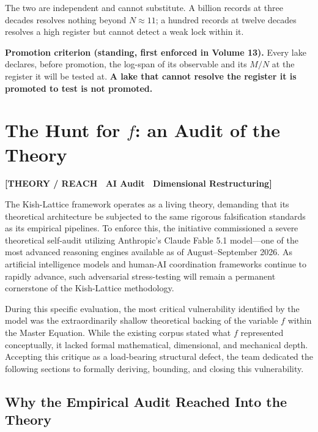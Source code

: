 \documentclass[11pt, letterpaper, openany]{book}
\newcommand{\MN}{M/N}
\begin{document}
The two are independent and cannot substitute. A billion records at three decades resolves
nothing beyond $N \approx 11$; a hundred records at twelve decades resolves a high register but
cannot detect a weak lock within it. 

\begin{predictionbox}
\textbf{Promotion criterion (standing, first enforced in Volume 13).} Every lake declares, before
promotion, the log-span of its observable and its $\MN$ at the register it will be tested at. \textbf{A lake that cannot resolve the register it is
promoted to test is not promoted.}
\end{predictionbox}

\chapter{The Hunt for $f$: an Audit of the Theory}
\label{chap:hunt-f}

\begin{center}
{\color{theorytag}\textbf{[THEORY / REACH \textbullet\ AI Audit \textbullet\ Dimensional Restructuring]}}
\end{center}

The Kish-Lattice framework operates as a living theory, demanding that its theoretical architecture be subjected to the same rigorous falsification standards as its empirical pipelines. To enforce this, the initiative commissioned a severe theoretical self-audit utilizing Anthropic's Claude Fable 5.1 model—one of the most advanced reasoning engines available as of August--September 2026. As artificial intelligence models and human-AI coordination frameworks continue to rapidly advance, such adversarial stress-testing will remain a permanent cornerstone of the Kish-Lattice methodology. 

During this specific evaluation, the most critical vulnerability identified by the model was the extraordinarily shallow theoretical backing of the variable $f$ within the Master Equation. While the existing corpus stated what $f$ represented conceptually, it lacked formal mathematical, dimensional, and mechanical depth. Accepting this critique as a load-bearing structural defect, the team dedicated the following sections to formally deriving, bounding, and closing this vulnerability.

\section{Why the Empirical Audit Reached Into the Theory}
\end{document}
